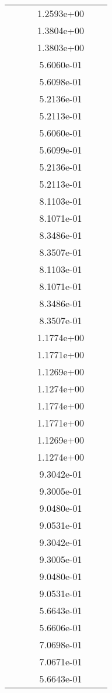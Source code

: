 \begin{xltabular}{\textwidth}{r|rS[table-format=1.3e+2]S[table-format=1.4e+2]S[table-format=1.4e+2]S[table-format=-1.5]}
&  &  & 1.2593e+00 & & \\
&  &  & 1.3804e+00 & & \\
&  &  & 1.3803e+00 & & \\
&  &  & 5.6060e-01 & & \\
&  &  & 5.6098e-01 & & \\
&  &  & 5.2136e-01 & & \\
&  &  & 5.2113e-01 & & \\
&  &  & 5.6060e-01 & & \\
&  &  & 5.6099e-01 & & \\
&  &  & 5.2136e-01 & & \\
&  &  & 5.2113e-01 & & \\
&  &  & 8.1103e-01 & & \\
&  &  & 8.1071e-01 & & \\
&  &  & 8.3486e-01 & & \\
&  &  & 8.3507e-01 & & \\
&  &  & 8.1103e-01 & & \\
&  &  & 8.1071e-01 & & \\
&  &  & 8.3486e-01 & & \\
&  &  & 8.3507e-01 & & \\
&  &  & 1.1774e+00 & & \\
&  &  & 1.1771e+00 & & \\
&  &  & 1.1269e+00 & & \\
&  &  & 1.1274e+00 & & \\
&  &  & 1.1774e+00 & & \\
&  &  & 1.1771e+00 & & \\
&  &  & 1.1269e+00 & & \\
&  &  & 1.1274e+00 & & \\
&  &  & 9.3042e-01 & & \\
&  &  & 9.3005e-01 & & \\
&  &  & 9.0480e-01 & & \\
&  &  & 9.0531e-01 & & \\
&  &  & 9.3042e-01 & & \\
&  &  & 9.3005e-01 & & \\
&  &  & 9.0480e-01 & & \\
&  &  & 9.0531e-01 & & \\
&  &  & 5.6643e-01 & & \\
&  &  & 5.6606e-01 & & \\
&  &  & 7.0698e-01 & & \\
&  &  & 7.0671e-01 & & \\
&  &  & 5.6643e-01 & & \\

\end{xltabular}
